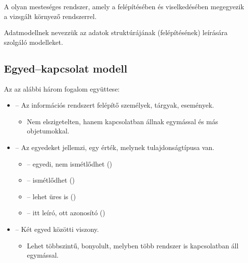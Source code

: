 \documentclass[../../main.tex]{subfiles}
\begin{document}
A  olyan mesteséges rendszer, amely a felépítésében és
viselkedésében megegyezik a vizsgált környező rendszerrel.

Adatmodellnek nevezzük az adatok struktúrájának (felépítésének) leírására
szolgáló modelleket.

\subsection{Egyed--kapcsolat modell}

Az  az alábbi három fogalom együttese:
\begin{itemize}
	\item {} -- Az információs rendszert felépítő személyek,
	      tárgyak, események.
	      \begin{itemize}
		      \item Nem elszigetelten, hanem kapcsolatban állnak
		            egymással és más objetumokkal.
	      \end{itemize}

	\item {} -- Az egyedeket jellemzi, egy érték,
	      melynek tulajdonságtípusa van.
	      \begin{itemize}
		      \item {}
		            \tabto{5.5cm} – \tabto{6.5cm}
		            egyedi, nem ismétlődhet ()

		      \item {}
		            \tabto{5.5cm} – \tabto{6.5cm}
		            ismétlődhet ()

		      \item {}
		            \tabto{5.5cm} – \tabto{6.5cm}
		            lehet üres is ()

		      \item {}
		            \tabto{5.5cm} – \tabto{6.5cm}
		            itt leíró, ott azonosító ()
	      \end{itemize}

	\item {} -- Két egyed közötti viszony.
	      \begin{itemize}
		      \item Lehet többszintű, bonyolult, melyben
		            több rendszer is kapcsolatban áll egymással.
	      \end{itemize}
\end{itemize}
\end{document}
